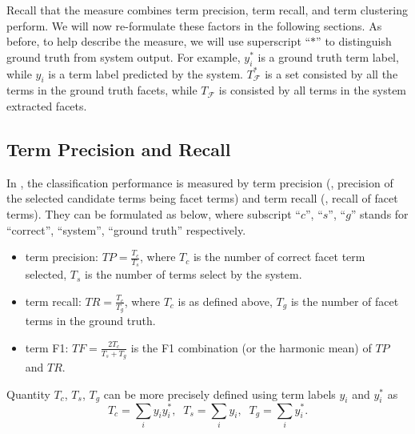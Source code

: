 Recall that the \PRF measure combines term precision, term recall, and term clustering perform. We will now re-formulate these factors in the following sections. As before, to help describe the measure, we will use superscript ``$*$'' to distinguish ground truth from system output. For example, $y_i^*$ is a ground truth term label, while $y_i$ is a term label predicted by the system. $T_\mathcal{F}^*$ is a set consisted by all the terms in the ground truth facets, while $T_\mathcal{F}$ is consisted by all terms in the system extracted facets.

\subsection{Term Precision and Recall}
In \PRF, the classification performance is measured by term precision (\ie, precision of the selected candidate terms being facet terms) and term recall (\ie, recall of facet terms).  They can be formulated as below, where subscript ``$c$'', ``$s$'', ``$g$'' stands for ``correct'', ``system'', ``ground truth'' respectively.
\begin{itemize}
 \item term precision: $T\!P = \frac{T_c}{T_s}$, where $T_c$ is the number of correct facet term selected, $T_s$ is the number of terms select by the system. 
 \item term recall: $T\!R = \frac{T_c}{T_g}$, where $T_c$ is as defined above, $T_g$ is the number of facet terms in the ground truth.
 \item term F1: $T\!F=\frac{2T_c}{T_s+T_g}$ is the F1 combination (or the harmonic mean) of $T\!P$ and $T\!R$.
\end{itemize}

Quantity $T_c$, $T_s$, $T_g$ can be more precisely defined using term labels $y_i$ and $y_i^{*}$ as
\begin{equation}
\label{eq:qterm}
 T_c=\sum_i{y_iy_i^{*}}, \;\; T_s=\sum_i{y_i}, \;\; T_g=\sum_i{y_i^{*}}.
\end{equation}

